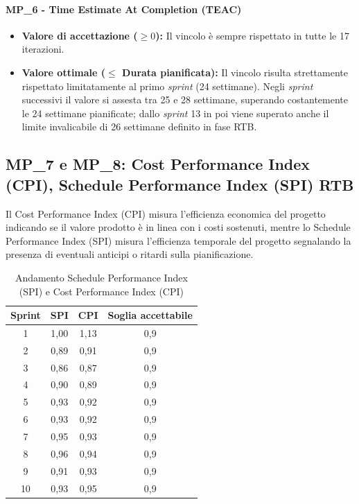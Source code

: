 \documentclass[12pt, a4paper]{article}
\begin{document}
\paragraph*{MP\_6 - Time Estimate At Completion (TEAC)}
\begin{itemize}
    \item \textbf{Valore di accettazione ($\ge 0$):} Il vincolo è sempre rispettato in tutte le 17 iterazioni.
    \item \textbf{Valore ottimale ($\le$ Durata pianificata):} Il vincolo risulta strettamente rispettato limitatamente al primo \textit{sprint} (24 settimane). Negli \textit{sprint} successivi il valore si assesta tra 25 e 28 settimane, superando costantemente le 24 settimane pianificate; dallo \textit{sprint} 13 in poi viene superato anche il limite invalicabile di 26 settimane definito in fase RTB.
\end{itemize}

\subsection{MP\_7 e MP\_8: \textbf{ Cost Performance Index (CPI)}, Schedule Performance Index (SPI) RTB}
Il Cost Performance Index (CPI) misura l’efficienza economica del progetto indicando se il valore prodotto è in linea con i costi sostenuti, mentre lo Schedule Performance Index (SPI) misura l’efficienza temporale del progetto segnalando la presenza di eventuali anticipi o ritardi sulla pianificazione.

\begin{table}[htbp]
    \centering
    \renewcommand{\arraystretch}{1.3}
    \begin{tabular}{|c|c|c|c|}
        \hline
        \textbf{Sprint} & \textbf{SPI} & \textbf{CPI} & \textbf{Soglia accettabile} \\ \hline
        1  & 1,00 & 1,13 & 0,9 \\ \hline
        2  & 0,89 & 0,91 & 0,9 \\ \hline
        3  & 0,86 & 0,87 & 0,9 \\ \hline
        4  & 0,90 & 0,89 & 0,9 \\ \hline
        5  & 0,93 & 0,92 & 0,9 \\ \hline
        6  & 0,93 & 0,92 & 0,9 \\ \hline
        7  & 0,95 & 0,93 & 0,9 \\ \hline
        8  & 0,96 & 0,94 & 0,9 \\ \hline
        9  & 0,91 & 0,93 & 0,9 \\ \hline
        10 & 0,93 & 0,95 & 0,9 \\ \hline
    \end{tabular}
    \caption{Andamento Schedule Performance Index (SPI) e Cost Performance Index (CPI)}
    \label{tab:spi_cpi_sprint}
\end{table}
\end{document}

